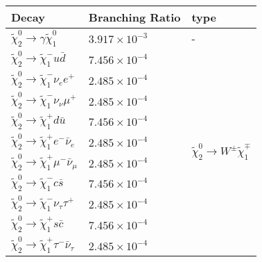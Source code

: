 \begin{table}[htbp]
    \begin{center}
        {\footnotesize
            \begin{tabular}{lll}
                \hline
                \hline
                Decay                                                                               & Branching Ratio            & type\\
                \hline
                $\widetilde{\chi}_{2}^{0} \to \gamma \widetilde{\chi}^{0}_{1}$                      & $3.917\times 10^{-3}$ & - \\
                \hline
                $\widetilde{\chi}_{2}^{0} \to \widetilde{\chi}_{1}^{-} u \bar{d}$                   & $7.456\times 10^{-4}$ & \multirow{10}{*}{$\widetilde{\chi}^{0}_{2} \to W^{\pm} \widetilde{\chi}^{\mp}_{1}$}\\
                $\widetilde{\chi}_{2}^{0} \to \widetilde{\chi}_{1}^{-} \nu_{e} e^{+}$               & $2.485\times 10^{-4}$ & \\
                $\widetilde{\chi}_{2}^{0} \to \widetilde{\chi}_{1}^{-} \nu_{\nu} \mu^{+}$           & $2.485\times 10^{-4}$ & \\
                $\widetilde{\chi}_{2}^{0} \to \widetilde{\chi}_{1}^{+} d \bar{u}$                   & $7.456\times 10^{-4}$ & \\
                $\widetilde{\chi}_{2}^{0} \to \widetilde{\chi}_{1}^{+} e^{-} \bar{\nu}_{e}$         & $2.485\times 10^{-4}$ & \\
                $\widetilde{\chi}_{2}^{0} \to \widetilde{\chi}_{1}^{+} \mu^{-} \bar{\nu}_{\mu}$     & $2.485\times 10^{-4}$ & \\
                $\widetilde{\chi}_{2}^{0} \to \widetilde{\chi}_{1}^{-} c \bar{s}$                   & $7.456\times 10^{-4}$ & \\
                $\widetilde{\chi}_{2}^{0} \to \widetilde{\chi}_{1}^{-} \nu_{\tau} \tau^{+}$         & $2.485\times 10^{-4}$ & \\
                $\widetilde{\chi}_{2}^{0} \to \widetilde{\chi}_{1}^{+} s \bar{c}$                   & $7.456\times 10^{-4}$ & \\
                $\widetilde{\chi}_{2}^{0} \to \widetilde{\chi}_{1}^{+} \tau^{-} \bar{\nu}_{\tau}$   & $2.485\times 10^{-4}$ & \\
                \hline

\end{tabular}}
\end{center}
\end{table}
